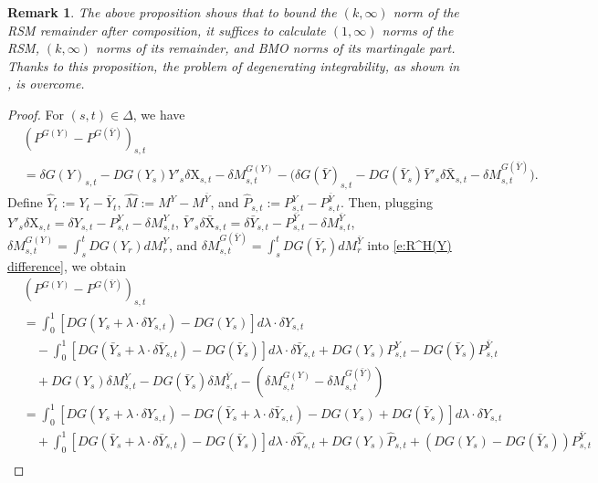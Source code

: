 \documentclass[11pt,reqno]{amsart}
\newtheorem{remark}[lemma]{Remark}
\numberwithin{equation}{section}
\begin{document}
\begin{remark}
The above proposition shows that to bound the $(k,\infty)$ norm of the \emph{RSM} remainder after composition, it suffices to calculate $(1,\infty)$ norms of the \emph{RSM}, $(k,\infty)$ norms of its remainder, and \emph{BMO} norms of its martingale part. Thanks to this proposition, the problem of degenerating integrability, as shown in \cite{fhl21}, is overcome. 
\end{remark}

\begin{proof}
For $(s,t) \in \Delta$, we have  
\begin{equation}\label{e:R^H(Y) difference}
\begin{aligned}
&(P^{G(Y)} - P^{G(\bar Y)})_{s,t} \\
& = \delta G(Y)_{s,t} - DG(Y_{s})Y'_{s} \delta \mathrm X_{s,t} - \delta M^{G(Y)}_{s,t} - \big( \delta G(\bar Y)_{s,t}- DG(\bar Y_{s})\bar Y'_{s} \delta \bar{\mathrm X}_{s,t} - \delta M^{G(\bar Y)}_{s,t}\big).
\end{aligned}
\end{equation}
Define 
$
\hat Y_t := Y_t - \bar Y_t$, $\hat M := M^Y - M^{\bar Y}$, and $ \hat P_{s,t} := P^Y_{s,t} - P^{\bar Y}_{s,t}
$.
Then, plugging  $Y'_{s}\delta \mathrm X_{s,t} = \delta Y_{s,t} - P^Y_{s,t} - \delta M^{Y}_{s,t}$, $\bar Y'_{s} \delta \bar{\mathrm X}_{s,t} = \delta \bar Y_{s,t} - P^{\bar Y}_{s,t} - \delta M^{\bar Y}_{s,t}$, $\delta M_{s,t}^{G(Y)}=\int_s^t DG(Y_r) dM_r^Y$, and $\delta M_{s,t}^{G(\bar Y)}=\int_s^t DG(\bar Y_r) dM_r^{\bar Y}$ into \eqref{e:R^H(Y) difference}, we obtain 
\begin{align}\nonumber
&(P^{G(Y)} - P^{G(\bar Y)})_{s,t}\\ \nonumber
&= \int_{0}^{1}[DG(Y_{s} + \lambda \cdot \delta Y_{s,t}) - DG(Y_s)]d\lambda \cdot \delta Y_{s,t} \\ \nonumber
&\quad - \int_{0}^{1}[DG(\bar Y_{s} + \lambda \cdot \delta \bar Y_{s,t}) - DG(\bar Y_s)]d\lambda \cdot \delta \bar Y_{s,t} + DG(Y_s) P^Y_{s,t} - DG(\bar Y_s) P^{\bar Y}_{s,t} \\ \nonumber
&\quad + DG(Y_s)\delta M^Y_{s,t} - DG(\bar Y_s)\delta M^{\bar Y}_{s,t} - (\delta M^{G(Y)}_{s,t} - \delta M^{G(\bar Y)}_{s,t}) \\ \label{e:identity E.R - R}
& = \int_{0}^{1} [ DG(Y_{s} + \lambda \cdot \delta Y_{s,t}) - DG(\bar Y_{s} + \lambda \cdot \delta \bar Y_{s,t}) - DG(Y_{s})  + DG(\bar Y_{s})] d\lambda \cdot \delta Y_{s,t}\\ \nonumber
&\quad + \int_{0}^{1} [  DG(\bar Y_{s} + \lambda \cdot \delta \bar Y_{s,t}) - DG(\bar Y_{s})] d\lambda \cdot \delta \hat Y_{s,t} + DG(Y_s) \hat P_{s,t} + \left(DG(Y_{s}) - DG(\bar Y_s)\right) P^{\bar Y}_{s,t}\\ \nonumber

\end{align}
\end{proof}
\end{document}
